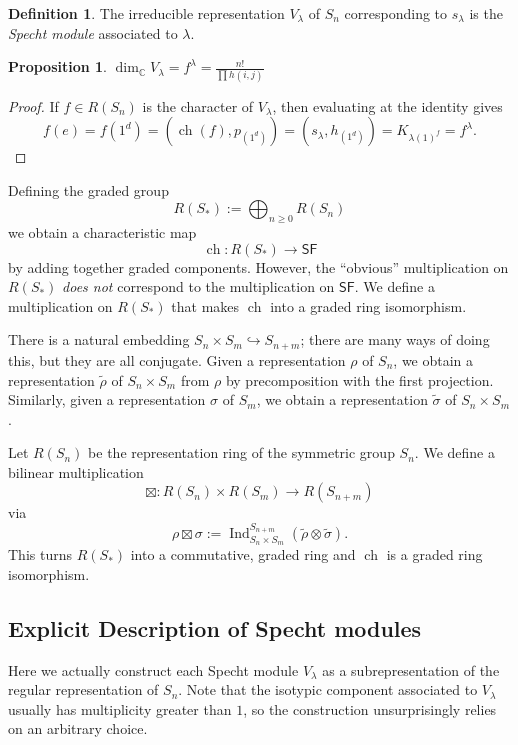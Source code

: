 \documentclass[12pt]{article}
\theoremstyle{plain}
\newtheorem{proposition}[theorem]{Proposition}
\theoremstyle{definition}
\newtheorem{definition}[theorem]{Definition}
\theoremstyle{remark}
\numberwithin{equation}{section}
\begin{document}
\begin{definition}
The irreducible representation $V_\lambda$ of $S_n$ corresponding to
$s_\lambda$ is the \emph{Specht module} associated to $\lambda$.
\end{definition}

\begin{proposition}
$\displaystyle \dim_{\mathbb{C}} V_\lambda = f^\lambda
=\frac{n!}{\prod h(i,j)}$
\end{proposition}

\begin{proof}
If $f \in R(S_n)$ is the character of $V_\lambda$,
then evaluating at the identity gives
\[
f(e)=f(1^d)= ( \operatorname{ch}(f), p_{(1^d)} )
= (s_\lambda, h_{(1^d)}) = K_{\lambda(1)^f}=f^\lambda.
\]
\end{proof}

Defining the graded group
\[
R(S_\ast) := \bigoplus_{n \ge 0} R(S_n)
\]
we obtain a characteristic map
\[
\operatorname{ch} : R(S_\ast) \to \mathsf{SF}
\]
by adding together graded components.
However, the ``obvious'' multiplication on $R(S_\ast)$
\emph{does not} correspond to the multiplication on $\mathsf{SF}$.
We define a multiplication on $R(S_\ast)$ that makes
$\operatorname{ch}$ into a graded ring isomorphism.

There is a natural embedding $S_n \times S_m \hookrightarrow S_{n+m}$;
there are many ways of doing this, but they are all conjugate.
Given a representation $\rho$ of $S_n$, we obtain a representation
$\widetilde{\rho}$ of $S_n \times S_m$ from $\rho$ by precomposition
with the first projection.  Similarly, given a representation $\sigma$
of $S_m$, we obtain a representation $\widetilde{\sigma}$ of
$S_n \times S_m$.

Let $R(S_n)$ be the representation ring of the symmetric group $S_n$. 
We define a bilinear multiplication
\[ \boxtimes : R(S_n) \times R(S_m) \to R(S_{n+m}) \]
via
\[
\rho \boxtimes \sigma := \operatorname{Ind}_{S_n \times S_m}^{S_{n+m}}
(\widetilde{\rho} \otimes \widetilde{\sigma}).
\]
This turns $R(S_\ast)$ into a commutative, graded ring
and $\operatorname{ch}$ is a graded ring isomorphism.

\subsection{Explicit Description of Specht modules}

Here we actually construct each Specht module $V_\lambda$
as a subrepresentation of the regular representation of $S_n$.
Note that the isotypic component associated to $V_\lambda$ usually has
multiplicity greater than $1$, so the construction unsurprisingly relies
on an arbitrary choice.
\end{document}
